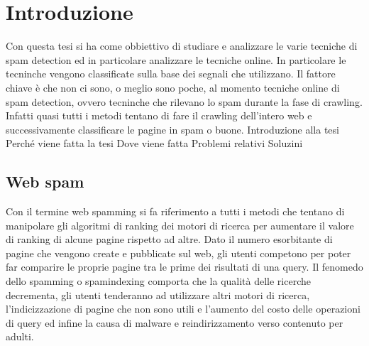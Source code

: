 \chapter{Introduzione}
Con questa tesi si ha come obbiettivo di studiare e analizzare le varie tecniche di spam detection ed in particolare analizzare le tecniche online. In particolare le tecninche vengono classificate sulla base dei segnali che utilizzano. Il fattore chiave è che non ci sono, o meglio sono poche, al momento tecniche online di spam detection, ovvero tecninche che rilevano lo spam durante la fase di crawling. Infatti quasi tutti i metodi tentano di fare il crawling dell'intero web e successivamente classificare le pagine in spam o buone. 
Introduzione alla tesi
Perché viene fatta la tesi
Dove viene fatta
Problemi relativi
Soluzini
\section{Web spam}
Con il termine web spamming si fa riferimento a tutti i metodi che tentano di manipolare gli algoritmi di ranking dei motori di ricerca per aumentare il valore di ranking di alcune pagine rispetto ad altre\cite{ilprints646}.
Dato il numero esorbitante di pagine che vengono create e pubblicate sul web, gli utenti competono per poter far comparire le proprie pagine tra le prime dei risultati di una query. %
Il fenomedo dello spamming o spamindexing comporta che la qualità delle ricerche decrementa, gli utenti tenderanno ad utilizzare altri motori di ricerca, l'indicizzazione di pagine che non sono utili e l'aumento del costo delle operazioni di query ed infine la causa di malware e reindirizzamento verso contenuto per adulti\cite{Spirin:2012:SWS:2207243.2207252}.